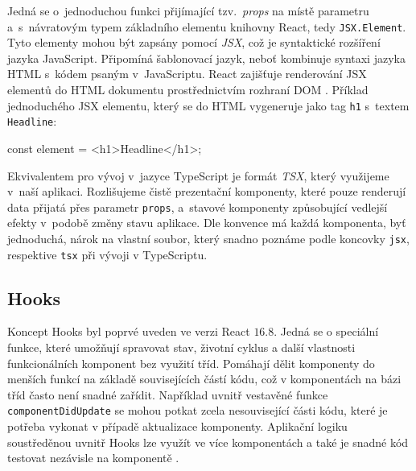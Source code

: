 Jedná se o~jednoduchou funkci přijímající tzv.~\emph{props} na místě parametru a~s~návratovým typem základního elementu knihovny React, tedy \texttt{JSX.Element}. Tyto elementy mohou být zapsány pomocí \emph{JSX}, což je syntaktické rozšíření jazyka JavaScript. Připomíná šablonovací jazyk, neboť kombinuje syntaxi jazyka HTML s~kódem psaným v~JavaScriptu. React zajišťuje renderování JSX elementů do HTML dokumentu prostřednictvím rozhraní DOM \citep{jsx-intro}. Příklad jednoduchého JSX elementu, který se do HTML vygeneruje jako tag \texttt{h1} s~textem \texttt{Headline}:

\begin{code}
const element = <h1>Headline</h1>;
\end{code}

Ekvivalentem pro vývoj v~jazyce TypeScript je formát \emph{TSX}, který využijeme v~naší aplikaci. Rozlišujeme čistě prezentační komponenty, které pouze renderují data přijatá přes parametr \texttt{props}, a~stavové komponenty způsobující vedlejší efekty v~podobě změny stavu aplikace. Dle konvence má každá komponenta, byť jednoduchá, nárok na vlastní soubor, který snadno poznáme podle koncovky \texttt{jsx}, respektive \texttt{tsx} při vývoji v TypeScriptu.

\subsection{Hooks}

Koncept Hooks byl poprvé uveden ve verzi React $16.8$. Jedná se o speciální funkce, které umožňují spravovat stav, životní cyklus a další vlastnosti funkcionálních komponent bez využití tříd. Pomáhají dělit komponenty do menších funkcí na základě souvisejících částí kódu, což v komponentách na bázi tříd často není snadné zařídit. Například uvnitř vestavěné funkce \texttt{componentDidUpdate} se mohou potkat zcela nesouvisející části kódu, které je potřeba vykonat v případě aktualizace komponenty. Aplikační logiku soustředěnou uvnitř Hooks lze využít ve více komponentách a také je snadné kód testovat nezávisle na komponentě \citep{react-hooks}.

